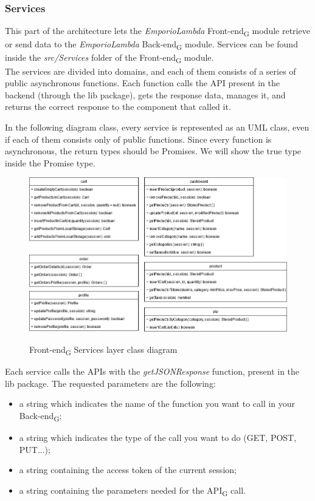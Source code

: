 \subsubsection{Services}
This part of the architecture lets the \textit{EmporioLambda} Front-end\textsubscript{G} module retrieve or send data to the \textit{EmporioLambda} Back-end\textsubscript{G} module. Services can be found inside the \textit{src/Services} folder of the Front-end\textsubscript{G} module.\\

The services are divided into domains, and each of them consists of a series of public asynchronous functions. Each function calls the API present in the backend (through the lib package), gets the response data, manages it, and returns the correct response to the component that called it.

In the following diagram class, every service is represented as an UML class, even if each of them consists only of public functions. Since every function is asynchronous, the return types should be Promises. We will show the true type inside the Promise type.

\begin{figure}[H]
\centering
\includegraphics[scale=0.50]{res/Architettura/Frontend/img/services_frontend_class}\\
\caption{Front-end\textsubscript{G} Services layer class diagram}
\end{figure}


Each service calls the APIs with the \textit{getJSONResponse} function, present in the lib package. The requested parameters are the following:

\begin{itemize}
\item a string which indicates the name of the function you want to call in your Back-end\textsubscript{G}; 
\item a string which indicates the type of the call you want to do (GET, POST, PUT...);
\item a string containing the access token of the current session; 
\item a string containing the parameters needed for the API\textsubscript{G} call. 
\end{itemize} 


